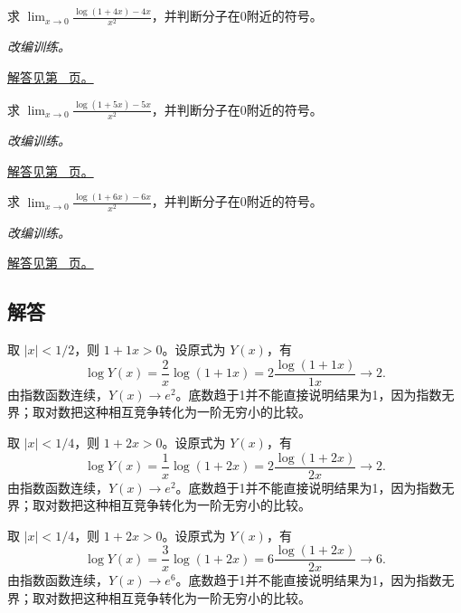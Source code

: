\documentclass[UTF8,12pt,a4paper,fontset=fandol]{ctexart}
\begin{document}
\begin{example}[对数减去线性项]\label{ex:c5q22}
求 $\displaystyle\lim_{x\to0}\frac{\log(1+4x)-4x}{x^2}$，并判断分子在0附近的符号。
\par\textit{改编训练。}\par\hyperref[ans:c5q22]{解答见第~\pageref{ans:c5q22} 页。}
\end{example}
\begin{example}[对数减去线性项]\label{ex:c5q23}
求 $\displaystyle\lim_{x\to0}\frac{\log(1+5x)-5x}{x^2}$，并判断分子在0附近的符号。
\par\textit{改编训练。}\par\hyperref[ans:c5q23]{解答见第~\pageref{ans:c5q23} 页。}
\end{example}
\begin{example}[对数减去线性项]\label{ex:c5q24}
求 $\displaystyle\lim_{x\to0}\frac{\log(1+6x)-6x}{x^2}$，并判断分子在0附近的符号。
\par\textit{改编训练。}\par\hyperref[ans:c5q24]{解答见第~\pageref{ans:c5q24} 页。}
\end{example}
\subsection{解答}
\begin{solve}\label{ans:c5q1}
取 $|x|<1/2$，则 $1+1x>0$。设原式为 $Y(x)$，有
\[
\log Y(x)=\frac{2}x\log(1+1x)=2\frac{\log(1+1x)}{1x}\longrightarrow 2.
\]
由指数函数连续，$Y(x)\to e^{2}$。底数趋于1并不能直接说明结果为1，因为指数无界；取对数把这种相互竞争转化为一阶无穷小的比较。
\end{solve}

\begin{solve}\label{ans:c5q2}
取 $|x|<1/4$，则 $1+2x>0$。设原式为 $Y(x)$，有
\[
\log Y(x)=\frac{1}x\log(1+2x)=2\frac{\log(1+2x)}{2x}\longrightarrow 2.
\]
由指数函数连续，$Y(x)\to e^{2}$。底数趋于1并不能直接说明结果为1，因为指数无界；取对数把这种相互竞争转化为一阶无穷小的比较。
\end{solve}

\begin{solve}\label{ans:c5q3}
取 $|x|<1/4$，则 $1+2x>0$。设原式为 $Y(x)$，有
\[
\log Y(x)=\frac{3}x\log(1+2x)=6\frac{\log(1+2x)}{2x}\longrightarrow 6.
\]
由指数函数连续，$Y(x)\to e^{6}$。底数趋于1并不能直接说明结果为1，因为指数无界；取对数把这种相互竞争转化为一阶无穷小的比较。
\end{solve}
\end{document}
